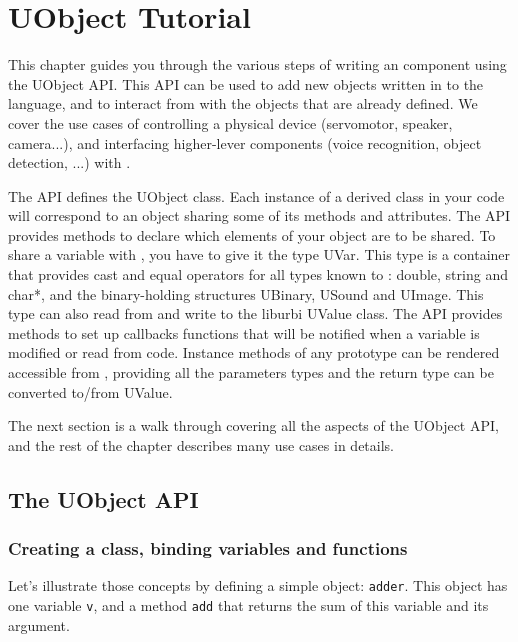 \chapter{UObject Tutorial}
\label{sec:tut:uobject}

This chapter guides you through the various steps of writing an \urbi
\Cxx component using the UObject API. This API can be used to add new
objects written in \Cxx to the \urbi language, and to interact from \Cxx
with the objects that are already defined. We cover the use cases of
controlling a physical device (servomotor, speaker, camera...), and
interfacing higher-lever components (voice recognition, object
detection, ...) with \urbi.

The API defines the UObject class. Each instance of a derived class in
your \Cxx code will correspond to an \urbi object sharing some of its
methods and attributes. The API provides methods to declare which
elements of your object are to be shared. To share a variable with
\urbi, you have to give it the type UVar. This type is a container that
provides cast and equal operators for all types known to \urbi: double,
string and char*, and the binary-holding structures UBinary, USound
and UImage. This type can also read from and write to the liburbi
UValue class. The API provides methods to set up callbacks functions
that will be notified when a variable is modified or read from \urbi
code. Instance methods of any prototype can be rendered accessible
from \urbi, providing all the parameters types and the return type can
be converted to/from UValue.

The next section is a walk through covering all the aspects of the
UObject API, and the rest of the chapter describes many use cases in
details.

\section{The UObject API}

\subsection{Creating a class, binding variables and functions}

Let's illustrate those concepts by defining a simple object:
\lstinline{adder}. This object has one variable \lstinline{v}, and a
method \lstinline{add} that returns the sum of this variable and its
argument.


